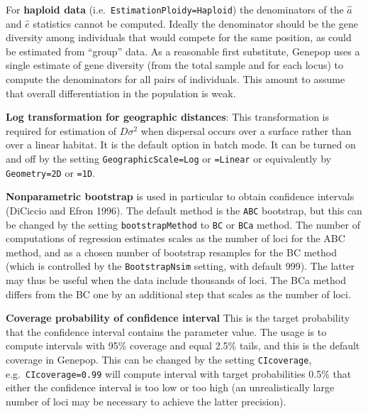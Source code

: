 \documentclass[
  12pt,
]{book}
\begin{document}
For \textbf{haploid data} (i.e.~\texttt{EstimationPloidy=Haploid}) the denominators of the \(\hat{a}\) and \(\hat{e}\) statistics cannot be computed. Ideally the denominator should be the gene diversity among individuals that would compete for the same position, as could be estimated from ``group'' data. As a reasonable first substitute, Genepop uses a single estimate of gene diversity (from the total sample and for each locus) to compute the denominators for all pairs of individuals. This amount to assume that overall differentiation in the population is weak.

\textbf{Log transformation for geographic distances}: This transformation is required for estimation of \(D\sigma^2\) when dispersal occurs over a surface rather than over a linear habitat. It is the default option in batch mode. It can be turned on and off by the setting \texttt{GeographicScale=Log} or \texttt{=Linear} or equivalently by \texttt{Geometry=2D} or \texttt{=1D}.

\textbf{Nonparametric bootstrap} is used in particular to obtain confidence intervals (DiCiccio and Efron 1996). The default method is the \texttt{ABC} bootstrap, but this can be changed by the setting \texttt{bootstrapMethod} to \texttt{BC} or \texttt{BCa} method. The number of computations of regression estimates scales as the number of loci for the ABC method, and as a chosen number of bootstrap resamples for the BC method (which is controlled by the \texttt{BootstrapNsim} setting, with default 999). The latter may thus be useful when the data include thousands of loci. The BCa method differs from the BC one by an additional step that scales as the number of loci.

\textbf{Coverage probability of confidence interval} This is the target probability that the confidence interval contains the parameter value. The usage is to compute intervals with 95\% coverage and equal 2.5\% tails, and this is the default coverage in Genepop. This can be changed by the setting \texttt{CIcoverage}, e.g.~\texttt{CIcoverage=0.99} will compute interval with target probabilities 0.5\% that either the confidence interval is too low or too high (an unrealistically large number of loci may be necessary to achieve the latter precision).
\end{document}
